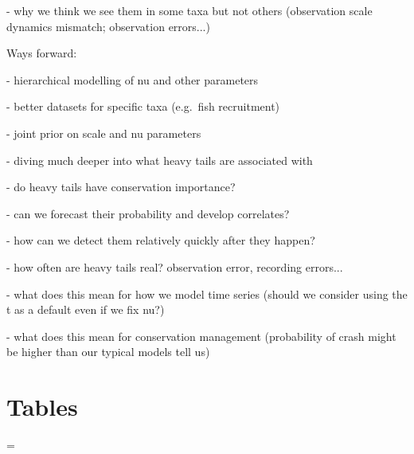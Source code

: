 \documentclass[11pt]{article}
\begin{document}
- why we think we see them in some taxa but not others (observation scale dynamics mismatch; observation errors...)

Ways forward:

- hierarchical modelling of nu and other parameters

- better datasets for specific taxa (e.g.\ fish recruitment)

- joint prior on scale and nu parameters

- diving much deeper into what heavy tails are associated with

- do heavy tails have conservation importance?

- can we forecast their probability and develop correlates?

- how can we detect them relatively quickly after they happen?

- how often are heavy tails real? observation error, recording errors...

- what does this mean for how we model time series (should we consider using the t as a default even if we fix nu?)

- what does this mean for conservation management (probability of crash  might be higher than our typical models tell us)



\clearpage

\section{Tables}

\LTcapwidth=\textwidth
{}
\end{document}
